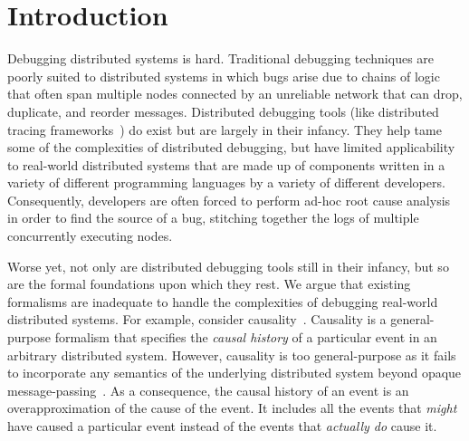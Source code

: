 \section{Introduction}
Debugging distributed systems is hard. Traditional debugging techniques are
poorly suited to distributed systems in which bugs arise due to chains of logic
that often span multiple  nodes connected by an unreliable network that can
drop, duplicate, and reorder messages. Distributed debugging tools (like
distributed tracing frameworks~\cite{sigelman2010dapper, fonseca2007x}) do
exist but are largely in their infancy. They help tame some of the complexities
of distributed debugging, but have limited applicability to real-world
distributed systems that are made up of components written in a variety of
different programming languages by a variety of different developers.
Consequently, developers are often forced to perform ad-hoc root cause analysis
in order to find the source of a bug, stitching together the logs of multiple
concurrently executing nodes.

Worse yet, not only are distributed debugging tools still in their infancy, but
so are the formal foundations upon which they rest.
 We argue that existing
formalisms are inadequate to handle the complexities of debugging real-world
distributed systems. For example, consider causality~\cite{lamport1978time}.
Causality is a general-purpose formalism that specifies the \emph{causal
history} of a particular event in an arbitrary distributed system. However,
causality is too general-purpose as it fails to incorporate any semantics of the
underlying distributed system beyond opaque message-passing~\cite{bailis2012potential}. As a consequence, the causal history of an event
is an overapproximation of the cause of the event. It includes all the events
that \emph{might} have caused a particular event instead of the events that
\emph{actually do} cause it.

